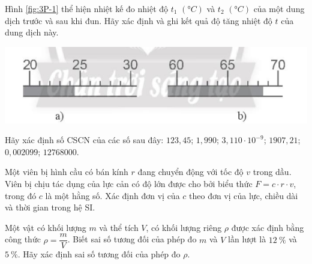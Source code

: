 \begin{ex}
	Hình \ref{fig:3P-1} thể hiện nhiệt kế đo nhiệt độ $t_1$ $\left(\si{\degree C}\right)$ và $t_2$ $\left(\si{\degree C}\right)$ của một dung dịch trước và sau khi đun. Hãy xác định và ghi kết quả độ tăng nhiệt độ $t$ của dung dịch này.
	\begin{center}
		\includegraphics[scale=0.5]{figs/G10Y25B2-2}
		\label{fig:3P-1}
	\end{center}
\end{ex}

\begin{ex}
	Hãy xác định số CSCN của các số sau đây: $123,45$; $1,990$; $3,110\cdot 10^{-9}$; $1907,21$; $0,002099$; $12768000$. 
\end{ex}

\begin{ex}
	Một viên bị hình cầu có bán kính $r$ đang chuyển động với tốc độ $v$ trong dầu. Viên bị chịu tác dụng của lực cản có độ lớn được cho bởi biểu thức $F=c\cdot r\cdot v$, trong đó $c$ là một hằng số. Xác định đơn vị của $c$ theo đơn vị của lực, chiều dài và thời gian trong hệ SI.
\end{ex}

\begin{ex}
	Một vật có khối lượng $m$ và thể tích $V$, có khối lượng riêng $\rho$ được xác định bằng công thức $\rho =\dfrac{m}{V}$. Biết sai số tương đối của phép đo $m$ và $V$ lần lượt là $\SI{12}{\percent}$ và $\SI{5}{\percent}$. Hãy xác định sai số tương đối của phép đo $\rho$.
\end{ex}

